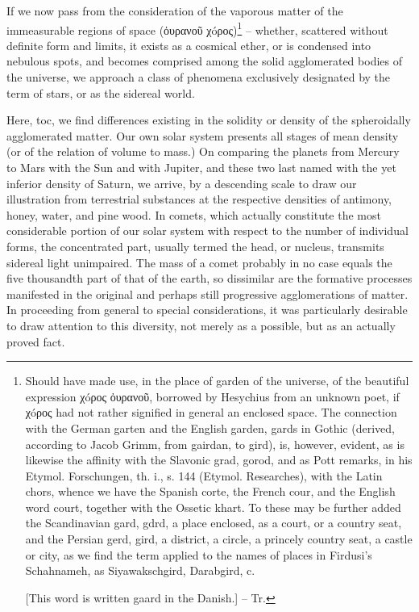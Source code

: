 If we now pass from the consideration of the vaporous matter of the immeasurable regions of space (ὀυρανοῦ χóρος)\footnote{Should have made use, in the place of garden of the universe, of the beautiful expression χóρος ὀυρανοῦ, borrowed by Hesychius from an unknown poet, if χóρος had not rather signified in general an enclosed space. The connection with the German garten and the English garden, gards in Gothic (derived, according to Jacob Grimm, from gairdan, to gird), is, however, evident, as is likewise the affinity with the Slavonic grad, gorod, and as Pott remarks, in his Etymol. Forschungen, th. i., s. 144 (Etymol. Researches), with the Latin chors, whence we have the Spanish corte, the French cour, and the English word court, together with the Ossetic khart. To these may be further added the Scandinavian gard, gdrd, a place enclosed, as a court, or a country seat, and the Persian gerd, gird, a district, a circle, a princely country seat, a castle or city, as we find the term applied to the names of places in Firdusi's Schahnameh, as Siyawakschgird, Darabgird, c.

[This word is written gaard in the Danish.] -- Tr.

} -- whether, scattered without definite form and limits, it exists as a cosmical ether, or is condensed into nebulous spots, and becomes comprised among the solid agglomerated bodies of the universe, we approach a class of phenomena exclusively designated by the term of stars, or as the sidereal world.

Here, toc, we find differences existing in the solidity or density of the spheroidally agglomerated matter. Our own solar system presents all stages of mean density (or of the relation of volume to mass.) On comparing the planets from Mercury to Mars with the Sun and with Jupiter, and these two last named with the yet inferior density of Saturn, we arrive, by a descending scale to draw our illustration from terrestrial substances at the respective densities of antimony, honey, water, and pine wood. In comets, which actually constitute the most considerable portion of our solar system with respect to the number of individual forms, the concentrated part, usually termed the head, or nucleus, transmits sidereal light unimpaired. The mass of a comet probably in no case equals the five thousandth part of that of the earth, so dissimilar are the formative processes manifested in the original and perhaps still progressive agglomerations of matter. In proceeding from general to special considerations, it was particularly desirable to draw attention to this diversity, not merely as a possible, but as an actually proved fact.

